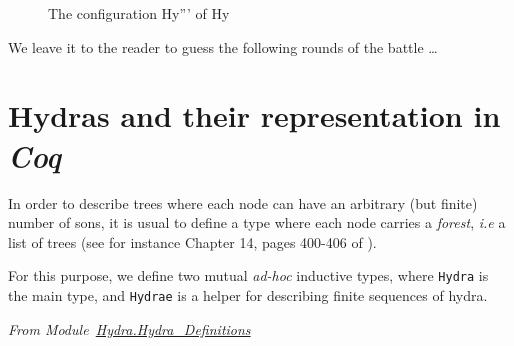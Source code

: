 \begin{figure}[hp]
\caption{The configuration Hy''' of Hy \label{fig:Hy5}}
\end{figure}
\FloatBarrier

We leave it to the reader  to guess the following  rounds of the battle \dots



\section{Hydras and their representation in \emph{Coq}}
\label{sec:orgheadline48}



In order to describe trees where each node can have an arbitrary (but finite) number of sons, it is usual to define a type where each node carries a \emph{forest}, \emph{i.e} a list of trees
(see for instance Chapter 14, pages 400-406 of \cite{BC04}).

For this purpose, we define two mutual \emph{ad-hoc}  inductive types, where \texttt{Hydra} is the main type, and \texttt{Hydrae} is a helper for describing finite sequences of hydra.
\label{types:Hydra}
\label{types:Hydrae}

\vspace{4pt}
\noindent
\emph{From Module~\href{../theories/html/hydras.Hydra.Hydra_Definitions.html\#Hydra}{Hydra.Hydra\_Definitions}}

